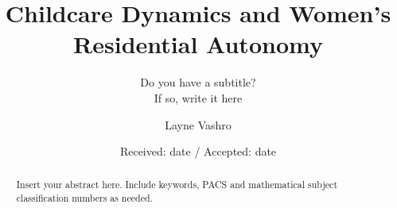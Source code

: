 \documentclass[smallextended]{svjour3}       %
\begin{document}
\title{Childcare Dynamics and Women's Residential Autonomy%
}
\subtitle{Do you have a subtitle?\\ If so, write it here}


\author{Layne Vashro
}



\date{Received: date / Accepted: date}


\maketitle

\begin{abstract}
Insert your abstract here. Include keywords, PACS and mathematical
subject classification numbers as needed.
\end{abstract}
\end{document}

